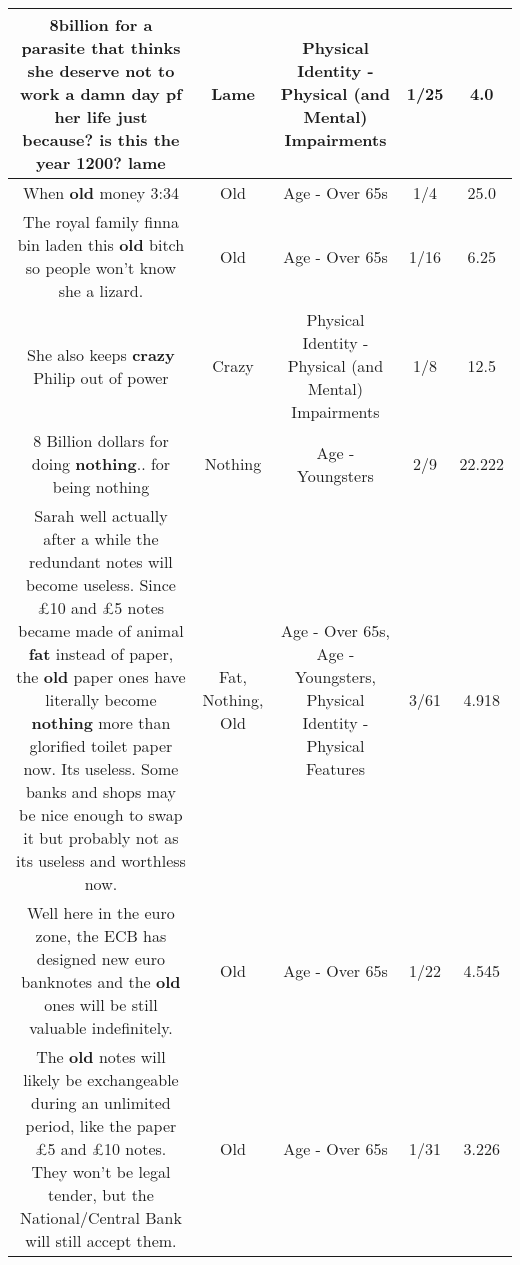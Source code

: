 \documentclass[11pt]{article}
\newlength\mylength
\begin{document}
\begin{center}
\begin{longtable}{|C{.65\mylength}|C{.30\mylength}|C{.12\mylength}|C{.12\mylength}|C{.12\mylength}|}
  \small 8billion for a parasite that thinks she deserve not to work a damn day pf her life just because? is this the year 1200? lame\normalsize   & Lame & Physical Identity - Physical (and Mental) Impairments & 1/25 & 4.0 \\  \hline
  \small When \textbf{old} money 3:34\normalsize   & Old & Age - Over 65s & 1/4 & 25.0 \\  \hline
  \small The royal family finna bin laden this \textbf{old} bitch so people won't know she a lizard.\normalsize   & Old & Age - Over 65s & 1/16 & 6.25 \\  \hline
  \small She also keeps \textbf{crazy} Philip out of power\normalsize   & Crazy & Physical Identity - Physical (and Mental) Impairments & 1/8 & 12.5 \\  \hline
  \small 8 Billion dollars for doing \textbf{nothing}.. for being nothing\normalsize   & Nothing & Age - Youngsters & 2/9 & 22.222 \\  \hline
  \small Sarah well actually after a while the redundant notes will become useless. Since £10 and £5 notes became made of animal \textbf{fat} instead of paper, the \textbf{old} paper ones have literally become \textbf{nothing} more than glorified toilet paper now. Its useless. Some banks and shops may be nice enough to swap it but probably not as its useless and worthless now.\normalsize   & Fat, Nothing, Old & Age - Over 65s, Age - Youngsters, Physical Identity - Physical Features & 3/61 & 4.918 \\  \hline
  \small Well here in the euro zone, the ECB has designed new euro banknotes and the \textbf{old} ones will be still valuable indefinitely.\normalsize   & Old & Age - Over 65s & 1/22 & 4.545 \\  \hline
  \small The \textbf{old} notes will likely be exchangeable during an unlimited period, like the paper £5 and £10 notes. They won't be legal tender, but the National/Central Bank will still accept them.\normalsize   & Old & Age - Over 65s & 1/31 & 3.226 \\  \hline

\end{longtable}
\end{center}
\end{document}
